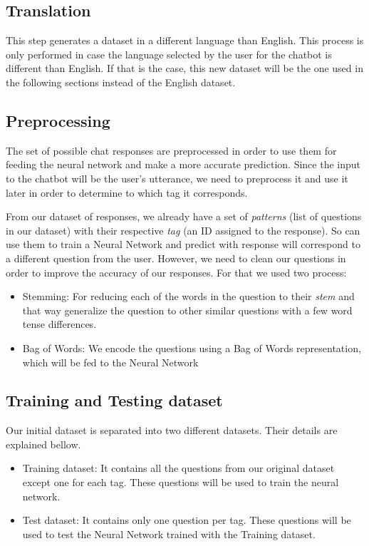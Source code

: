 \documentclass[]{article}
\begin{document}
\subsection{Translation}
This step generates a dataset in a different language than English. This process is only performed in case the language selected by the user for the chatbot is different than English. If that is the case, this new dataset will be the one used in the following sections instead of the English dataset.

\subsection{Preprocessing}
The set of possible chat responses are preprocessed in order to use them for feeding the neural network and make a more accurate prediction. Since the input to the chatbot will be the user's utterance, we need to preprocess it and use it later in order to determine to which tag it corresponds.

From our dataset of responses, we already have a set of \emph{patterns} (list of questions in our dataset) with their respective \emph{tag} (an ID assigned to the response). So can use them to train a Neural Network and predict with response will correspond to a different question from the user. However, we need to clean our questions in order to improve the accuracy of our responses. For that we used two process:

\begin{itemize}
  \item{Stemming:} For reducing each of the words in the question to their \emph{stem} and that way generalize the question to other similar questions with a few word tense differences.
  \item{Bag of Words:} We encode the questions using a Bag of Words representation, which will be fed to the Neural Network
\end{itemize}

\subsection{Training and Testing dataset}
Our initial dataset is separated into two different datasets. Their details are explained bellow.

\begin{itemize}
  \item{Training dataset:} It contains all the questions from our original dataset except one for each tag. These questions will be used to train the neural network.
  \item{Test dataset:} It contains only one question per tag. These questions will be used to test the Neural Network trained with the Training dataset.
\end{itemize}
\end{document}
